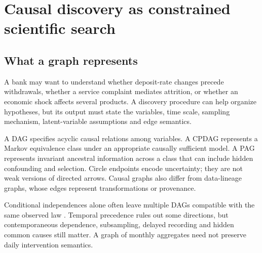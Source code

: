 \chapter{Causal discovery as constrained scientific search}\label{ch:discovery}
\section{What a graph represents}
A bank may want to understand whether deposit-rate changes precede withdrawals,
whether a service complaint mediates attrition, or whether an economic shock
affects several products. A discovery procedure can help organize hypotheses,
but its output must state the variables, time scale, sampling mechanism,
latent-variable assumptions and edge semantics.

A DAG specifies acyclic causal relations among variables. A CPDAG represents
a Markov equivalence class under an appropriate causally sufficient model.
A PAG represents invariant ancestral information across a class that can
include hidden confounding and selection. Circle endpoints encode uncertainty;
they are not weak versions of directed arrows. Causal graphs also differ
from data-lineage graphs, whose edges represent transformations or provenance.

Conditional independences alone often leave multiple DAGs compatible with
the same observed law \citep{peters2017}. Temporal precedence rules out
some directions, but contemporaneous dependence, subsampling, delayed
recording and hidden common causes still matter. A graph of monthly
aggregates need not preserve daily intervention semantics.

